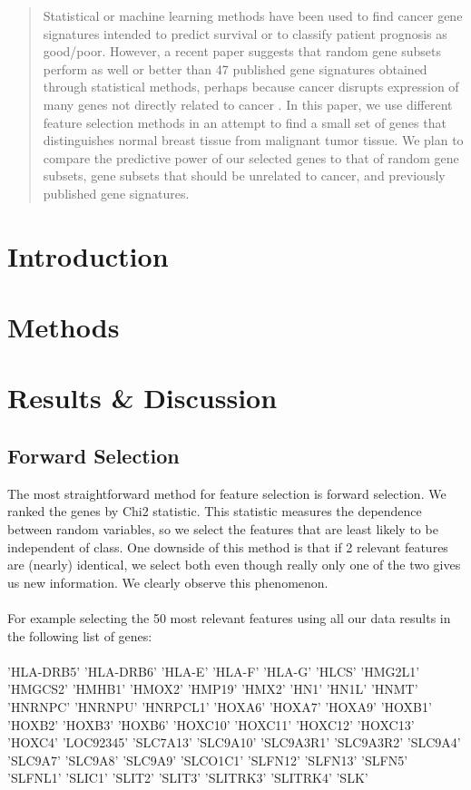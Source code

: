 \documentclass[11pt]{article}
\begin{document}
\maketitle

\begin{abstract}
Statistical or machine learning methods have been used to find cancer gene signatures intended to predict survival or to classify patient prognosis as good/poor. However, a recent paper suggests that random gene subsets perform as well or better than 47 published gene signatures obtained through statistical methods, perhaps because cancer disrupts expression of many genes not directly related to cancer \cite{venet}. In this paper, we use different feature selection methods in an attempt to find a small set of genes that distinguishes normal breast tissue from malignant tumor tissue. We plan to compare the predictive power of our selected genes to that of random gene subsets, gene subsets that should be unrelated to cancer, and previously published gene signatures.
\end{abstract}

\section{Introduction}

\section{Methods}


\section{Results \& Discussion}

\subsection{Forward Selection}
The most straightforward method for feature selection is forward selection. We ranked the genes by Chi2 statistic. This statistic measures the dependence between random variables, so we select the features that are least likely to be independent of class. One downside of this method is that if 2 relevant features are (nearly) identical, we select both even though really only one of the two gives us new information. We clearly observe this phenomenon. \\\\
For example selecting the 50 most relevant features using all our data results in the following list of genes:\\\\
'HLA-DRB5' 'HLA-DRB6' 'HLA-E' 'HLA-F' 'HLA-G' 'HLCS' 'HMG2L1' 'HMGCS2'
 'HMHB1' 'HMOX2' 'HMP19' 'HMX2' 'HN1' 'HN1L' 'HNMT' 'HNRNPC' 'HNRNPU'
 'HNRPCL1' 'HOXA6' 'HOXA7' 'HOXA9' 'HOXB1' 'HOXB2' 'HOXB3' 'HOXB6' 'HOXC10'
 'HOXC11' 'HOXC12' 'HOXC13' 'HOXC4' 'LOC92345' 'SLC7A13' 'SLC9A10'
 'SLC9A3R1' 'SLC9A3R2' 'SLC9A4' 'SLC9A7' 'SLC9A8' 'SLC9A9' 'SLCO1C1'
 'SLFN12' 'SLFN13' 'SLFN5' 'SLFNL1' 'SLIC1' 'SLIT2' 'SLIT3' 'SLITRK3'
 'SLITRK4' 'SLK'
 
\end{document}
